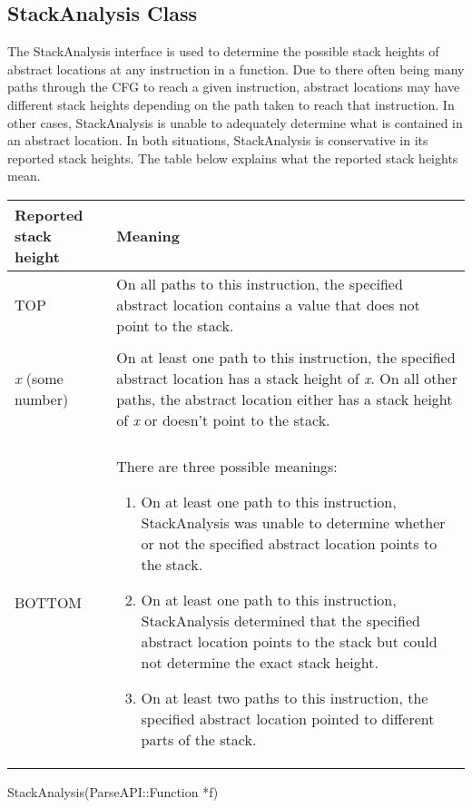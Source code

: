 \subsection{StackAnalysis Class}
\label{sec:stackanalysis}

The StackAnalysis interface is used to determine the possible stack heights of abstract locations at any instruction in a function.  Due to there often being many paths through the CFG to reach a given instruction, abstract locations may have different stack heights depending on the path taken to reach that instruction.  In other cases, StackAnalysis is unable to adequately determine what is contained in an abstract location.  In both situations, StackAnalysis is conservative in its reported stack heights.  The table below explains what the reported stack heights mean.

\begin{tabular}{p{1.25in}p{4.25in}}
	\toprule
	Reported stack height & Meaning \\
	\midrule
	TOP & On all paths to this instruction, the specified abstract location contains a value that does not point to the stack. \\\\
	\emph{x} (some number) & On at least one path to this instruction, the specified abstract location has a stack height of \emph{x}.  On all other paths, the abstract location either has a stack height of \emph{x} or doesn't point to the stack. \\\\
	BOTTOM & There are three possible meanings:
	  \begin{enumerate}
		\item On at least one path to this instruction, StackAnalysis was unable to determine whether or not the specified abstract location points to the stack.
		\item On at least one path to this instruction, StackAnalysis determined that the specified abstract location points to the stack but could not determine the exact stack height.
		\item On at least two paths to this instruction, the specified abstract location pointed to different parts of the stack.
	  \end{enumerate} \\
	\bottomrule
\end{tabular}

\begin{apient}
	StackAnalysis(ParseAPI::Function *f)
\end{apient}

